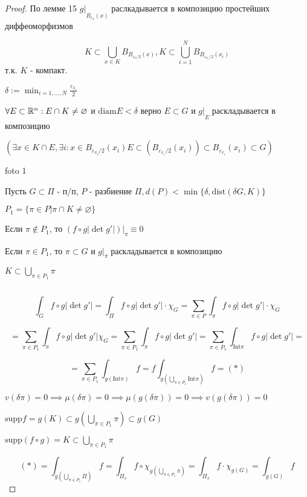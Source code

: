 \begin{proof}
        По лемме 15 $g|\underset{B_{\varepsilon_x}(x) }{}$ раслкадывается в композицию простейших диффеоморфизмов
        
        $$K \subset \bigcup_{x\in K} B_{B_{\varepsilon_x/2}(x) }, 
        K \subset \bigcup^N_{i=1} B_{B_{\varepsilon_{x_i}/2}(x_i) }$$
        т.к. $K$ - компакт.

        $\displaystyle\delta := \min_{i=1,\dotsc,N} \frac{\varepsilon_{x_i}}{2}$

        $\forall E \subset \mathbb{R}^n: E \cap K \neq \varnothing $ и $\text{diam}E < \delta$ 
        верно $E \subset G$ и $g | \underset{E}{ }$ раскладывается в композицию
    
        $\left(\exists x \in K \cap E, \exists i: x \in B_{\varepsilon_{x_i}/2}(x_i)
        E \subset (B_{\varepsilon_{x_i}/2}(x_i)) \subset B_{\varepsilon_{x_i}}(x_i) \subset G
        \right)$

        foto 1

        Пусть $G \subset \Pi$ - п/п, $P$ - разбиение $\Pi, d(P) < \min \{
            \delta, \text{dist}(\delta G, K)\}$
            
        $P_1 = \{ \pi \in P | \pi \cap K \neq \varnothing\}$

        Если $\pi \notin P_1$, то $(f \circ g |\det g'|) | \underset{\pi}{ } \equiv 0$

        Если $\pi \in P_1$, то $\pi \subset G$ и $g|\underset{\pi}{ }$ раскладывается в композицию

        $K \subset \bigcup_{\pi \in P_1} \pi$

        \par $ $

        $$\int_{G} f\circ g |\det g'| = \int_\Pi f\circ g |\det g'| \cdot \chi_G = 
        \sum_{\pi \in P} \int_\pi f\circ g |\det g'| \cdot \chi_G$$

        $$=\sum_{\pi \in P_1} \int_\pi f \circ g |\det g'| \chi_G =  
        \sum_{\pi \in P_1} \int_\pi f\circ g |\det g'| = 
        \sum_{\pi \in P_1}\int_{\text{Int}\pi} f\circ g | \det g'| =$$

        $$
        = \sum_{\pi \in P_1} \int_{g(\text{Int}\pi)} f =
        f\int_{g(\bigcup_{\pi\in P_1}\text{Int}\pi)}f = (*)$$

        $v(\delta\pi) = 0\implies \mu(\delta\pi) = 0 \implies \mu(g(\delta\pi)) = 0 \implies v(g(\delta\pi))=0$

        $\text{supp}f = g(K) \subset g(\bigcup_{\pi\in P_1}\pi) \subset g(G)$

        $\text{supp}(f\circ g) = K \subset \bigcup_{\pi\in P_1}\pi$

        $$(*) = \int_{g(\bigcup_{\pi\in P_1}\Pi)}f = \int_{\Pi_x}f\circ \chi_{g(\bigcup_{\pi \in P_1}\pi)} = 
        \int_{\Pi_x}f\cdot \chi_{g(G)} = \int_{g(G)}f$$
        
    \end{proof}

